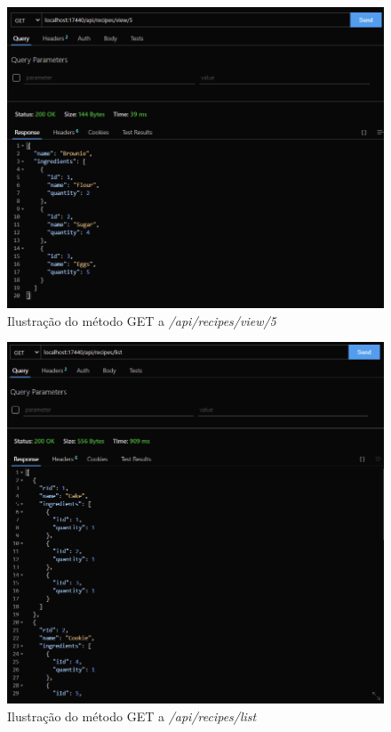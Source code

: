 \FloatBarrier
\begin{figure}[!hbt]
    \centering
    \includegraphics[width=14cm]{Resources/API/Recipes/Recipes (6).png}
    \caption{Ilustração do método GET a \textit{/api/recipes/view/5}}
    
\end{figure}
\FloatBarrier
\begin{figure}[!hbt]
    \centering
    \includegraphics[width=14cm]{Resources/API/Recipes/Recipes (7).png}
    \caption{Ilustração do método GET a \textit{/api/recipes/list}}
    
\end{figure}
\FloatBarrier

